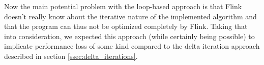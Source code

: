 
Now the main potential problem with the loop-based approach is that Flink doesn't really know
about the iterative nature of the implemented algorithm and that the program can thus not be
optimized completely by Flink. Taking that into consideration, we expected this approach (while
certainly being possible) to implicate performance loss of some kind compared to the delta
iteration approach described in section \ref{ssec:delta_iterations}.

